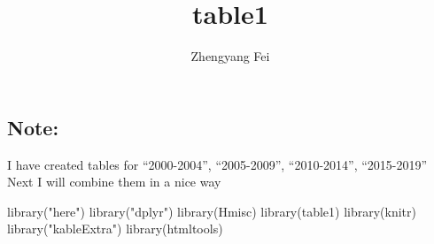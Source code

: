 \documentclass[
  letterpaper,
  DIV=11,
  numbers=noendperiod]{scrartcl}
\title{table1}
\author{Zhengyang Fei}
\date{}
\newenvironment{Shaded}{\begin{snugshade}}{\end{snugshade}}
\newcommand{\FunctionTok}[1]{\textcolor[rgb]{0.28,0.35,0.67}{#1}}
\newcommand{\NormalTok}[1]{\textcolor[rgb]{0.00,0.23,0.31}{#1}}
\newcommand{\StringTok}[1]{\textcolor[rgb]{0.13,0.47,0.30}{#1}}
\begin{document}
\maketitle

\subsection{Note:}\label{note}

I have created tables for ``2000-2004'', ``2005-2009'', ``2010-2014'',
``2015-2019'' Next I will combine them in a nice way

\begin{Shaded}
\begin{Highlighting}[]
\FunctionTok{library}\NormalTok{(}\StringTok{"here"}\NormalTok{)}
\FunctionTok{library}\NormalTok{(}\StringTok{"dplyr"}\NormalTok{)}
\FunctionTok{library}\NormalTok{(Hmisc)}
\FunctionTok{library}\NormalTok{(table1)}
\FunctionTok{library}\NormalTok{(knitr)}
\FunctionTok{library}\NormalTok{(}\StringTok{"kableExtra"}\NormalTok{)}
\FunctionTok{library}\NormalTok{(htmltools)}
\end{Highlighting}
\end{Shaded}
\end{document}
